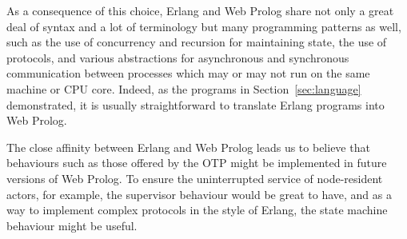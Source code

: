 \documentclass{tlp}
\begin{document}
As a consequence of this choice, Erlang and Web Prolog share not only a great deal of syntax and a lot of terminology  but many programming patterns as well, such as the use of concurrency and recursion for maintaining state, the use of protocols, and various abstractions for asynchronous and synchronous communication between processes which may or may not run on the same machine or CPU core. Indeed, as the programs in Section~\ref{sec:language} demonstrated, it is usually straightforward to translate Erlang programs into Web Prolog. %



The close affinity between Erlang and Web Prolog leads us to believe that behaviours such as those offered by the OTP might be implemented in future versions of Web Prolog. To ensure the uninterrupted service of node-resident actors, for example, the supervisor behaviour would be great to have, and as a way to implement complex protocols in the style of Erlang, the state machine behaviour might be useful.
\end{document}

